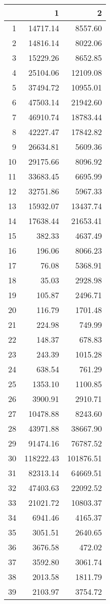 \begin{table}[ht]
\centering
\begin{tabular}{rrr}
  \hline
 & 1 & 2 \\ 
  \hline
1 & 14717.14 & 8557.60 \\ 
  2 & 14816.14 & 8022.06 \\ 
  3 & 15229.26 & 8652.85 \\ 
  4 & 25104.06 & 12109.08 \\ 
  5 & 37494.72 & 10955.01 \\ 
  6 & 47503.14 & 21942.60 \\ 
  7 & 46910.74 & 18783.44 \\ 
  8 & 42227.47 & 17842.82 \\ 
  9 & 26634.81 & 5609.36 \\ 
  10 & 29175.66 & 8096.92 \\ 
  11 & 33683.45 & 6695.99 \\ 
  12 & 32751.86 & 5967.33 \\ 
  13 & 15932.07 & 13437.74 \\ 
  14 & 17638.44 & 21653.41 \\ 
  15 & 382.33 & 4637.49 \\ 
  16 & 196.06 & 8066.23 \\ 
  17 & 76.08 & 5368.91 \\ 
  18 & 35.03 & 2928.98 \\ 
  19 & 105.87 & 2496.71 \\ 
  20 & 116.79 & 1701.48 \\ 
  21 & 224.98 & 749.99 \\ 
  22 & 148.37 & 678.83 \\ 
  23 & 243.39 & 1015.28 \\ 
  24 & 638.54 & 761.29 \\ 
  25 & 1353.10 & 1100.85 \\ 
  26 & 3900.91 & 2910.71 \\ 
  27 & 10478.88 & 8243.60 \\ 
  28 & 43971.88 & 38667.90 \\ 
  29 & 91474.16 & 76787.52 \\ 
  30 & 118222.43 & 101876.51 \\ 
  31 & 82313.14 & 64669.51 \\ 
  32 & 47403.63 & 22092.52 \\ 
  33 & 21021.72 & 10803.37 \\ 
  34 & 6941.46 & 4165.37 \\ 
  35 & 3051.51 & 2640.65 \\ 
  36 & 3676.58 & 472.02 \\ 
  37 & 3592.80 & 3061.74 \\ 
  38 & 2013.58 & 1811.79 \\ 
  39 & 2103.97 & 3754.72 \\ 
   \hline
\end{tabular}
\end{table}
